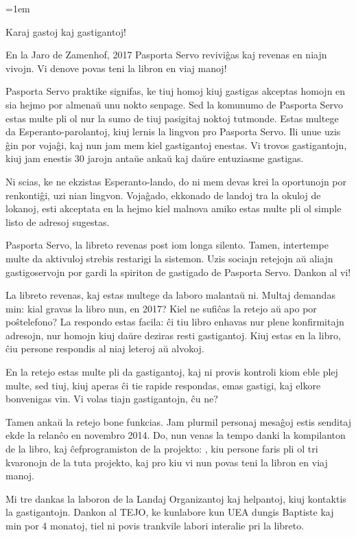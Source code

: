 \thispagestyle{plain}
{\parskip=1em

Karaj gastoj kaj gastigantoj!

\vspace{.8em}

En la Jaro de Zamenhof, 2017 Pasporta Servo reviviĝas kaj revenas en niajn vivojn. Vi denove povas teni la libron en viaj manoj!

Pasporta Servo praktike signifas, ke tiuj homoj kiuj gastigas akceptas homojn en sia hejmo por almenaŭ unu nokto senpage. Sed la komunumo de Pasporta Servo estas multe pli ol nur la sumo de tiuj pasigitaj noktoj tutmonde. Estas multege da Esperanto-parolantoj, kiuj lernis la lingvon pro Pasporta Servo. Ili unue uzis ĝin por vojaĝi, kaj nun jam mem kiel gastigantoj enestas. Vi trovos gastigantojn, kiuj jam enestis 30 jarojn antaŭe ankaŭ kaj daŭre entuziasme gastigas.

Ni scias, ke ne ekzistas Esperanto-lando, do ni mem devas krei la oportunojn por renkontiĝi, uzi nian lingvon. Vojaĝado, ekkonado de landoj tra la okuloj de lokanoj, esti akceptata en la hejmo kiel malnova amiko estas multe pli ol simple listo de adresoj sugestas.

Pasporta Servo, la libreto revenas post iom longa silento. Tamen, intertempe multe da aktivuloj strebis restarigi la sistemon. Uzis sociajn retejojn aŭ aliajn gastigoservojn por gardi la spiriton de gastigado de Pasporta Servo. Dankon al vi!

La libreto revenas, kaj estas multege da laboro malantaŭ ni. Multaj demandas min: kial gravas la libro nun, en 2017? Kiel ne sufiĉas la retejo aŭ apo por poŝtelefono? La respondo estas facila: ĉi tiu libro enhavas nur plene konfirmitajn adresojn, nur homojn kiuj daŭre deziras resti gastigantoj. Kiuj estas en la libro, ĉiu persone respondis al niaj leteroj aŭ alvokoj.

En la retejo estas multe pli da gastigantoj, kaj ni provis kontroli kiom eble plej multe, sed tiuj, kiuj aperas ĉi tie rapide respondas, emas gastigi, kaj elkore bonvenigas vin. Vi volas tiajn gastigantojn, ĉu ne?

Tamen ankaŭ la retejo bone funkcias. Jam plurmil personaj mesaĝoj estis senditaj ekde la relanĉo en novembro 2014. Do, nun venas la tempo danki la kompilanton de la libro, kaj ĉefprogramiston de la projekto: , kiu persone faris pli ol tri kvaronojn de la tuta projekto, kaj pro kiu vi nun povas teni la libron en viaj manoj.

Mi tre dankas la laboron de la Landaj Organizantoj kaj helpantoj, kiuj kontaktis la gastigantojn. Dankon al TEJO, ke kunlabore kun UEA dungis Baptiste kaj min por 4 monatoj, tiel ni povis trankvile labori interalie pri la libreto.

}
